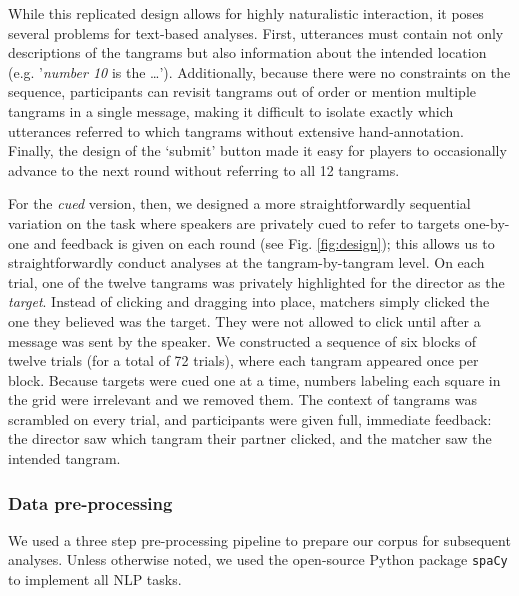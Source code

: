 While this replicated design allows for highly naturalistic interaction, it poses several problems for text-based analyses. 
First, utterances must contain not only descriptions of the tangrams but also information about the intended location (e.g. '\emph{number 10} is the \dots'). 
Additionally, because there were no constraints on the sequence, participants can revisit tangrams out of order or mention multiple tangrams in a single message, making it difficult to isolate exactly which utterances referred to which tangrams without extensive hand-annotation. 
Finally, the design of the `submit' button made it easy for players to occasionally advance to the next round without referring to all 12 tangrams. 

For the \emph{cued} version, then, we designed a more straightforwardly sequential variation on the task where speakers are privately cued to refer to targets one-by-one and feedback is given on each round (see Fig. \ref{fig:design}); this allows us to straightforwardly conduct analyses at the tangram-by-tangram level. 
On each trial, one of the twelve tangrams was privately highlighted for the director as the \emph{target}. 
Instead of clicking and dragging into place, matchers simply clicked the one they believed was the target. 
They were not allowed to click until after a message was sent by the speaker.  
We constructed a sequence of six blocks of twelve trials (for a total of 72 trials), where each tangram appeared once per block.
Because targets were cued one at a time, numbers labeling each square in the grid were irrelevant and we removed them. 
The context of tangrams was scrambled on every trial, and participants were given full, immediate feedback: the director saw which tangram their partner clicked, and the matcher saw the intended tangram.

\subsubsection{Data pre-processing}

We used a three step pre-processing pipeline to prepare our corpus for subsequent analyses. Unless otherwise noted, we used the open-source Python package \texttt{spaCy} to implement all NLP tasks. 

